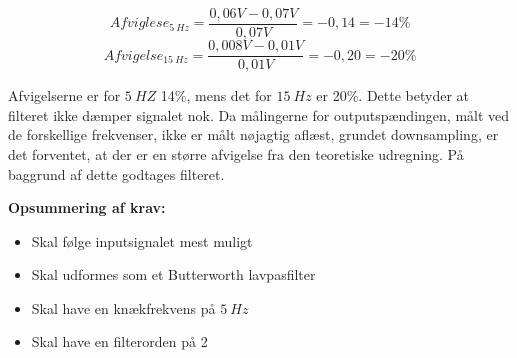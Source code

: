 \begin{equation} \label{equ:afvigelse1}
Afviglese_{5~Hz} = \frac{0,06V-0,07V}{0,07V} = -0,14  = - 14 \%
\end{equation}
\begin{equation} \label{equ:afvigelse2}
Afvigelse_{15~Hz} = \frac{0,008V-0,01V}{0,01V} = -0,20  = -20 \%
\end{equation}

\noindent 
Afvigelserne er for $5~HZ$ 14\%, mens det for $15~Hz$ er 20\%. Dette betyder at filteret ikke dæmper signalet nok. Da målingerne for outputspændingen, målt ved de forskellige frekvenser, ikke er målt nøjagtig aflæst, grundet downsampling, er det forventet, at der er en større afvigelse fra den teoretiske udregning. På baggrund af dette godtages filteret. 

\vspace{3mm}
\textbf{Opsummering af krav:}
\begin{itemize}
\item[\text{\sffamily \checkmark}] Skal følge inputsignalet mest muligt  
\item[\text{\sffamily \checkmark}] Skal udformes som et Butterworth lavpasfilter
\item[\text{\sffamily \checkmark}] Skal have en knækfrekvens på $5~Hz$
\item[\text{\sffamily \checkmark}] Skal have en filterorden på 2
\end{itemize}